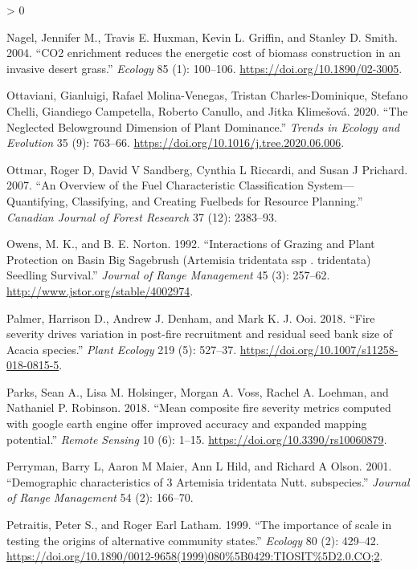 \documentclass[
  12pt,
]{article}
\newlength{\cslhangindent}
\newenvironment{CSLReferences}[2] %
 {%
  \setlength{\parindent}{0pt}
  \ifodd #1 \everypar{\setlength{\hangindent}{\cslhangindent}}\ignorespaces\fi
  \ifnum #2 > 0
  \setlength{\parskip}{#2\baselineskip}
  \fi
 }%
 {}
\begin{document}
\begin{CSLReferences}{1}{0}
\leavevmode\hypertarget{ref-Nagel2004}{}%
Nagel, Jennifer M., Travis E. Huxman, Kevin L. Griffin, and Stanley D.
Smith. 2004. {``{CO2 enrichment reduces the energetic cost of biomass
construction in an invasive desert grass}.''} \emph{Ecology} 85 (1):
100--106. \url{https://doi.org/10.1890/02-3005}.

\leavevmode\hypertarget{ref-Ottaviani2020}{}%
Ottaviani, Gianluigi, Rafael Molina-Venegas, Tristan Charles-Dominique,
Stefano Chelli, Giandiego Campetella, Roberto Canullo, and Jitka
Klimešová. 2020. {``{The Neglected Belowground Dimension of Plant
Dominance}.''} \emph{Trends in Ecology and Evolution} 35 (9): 763--66.
\url{https://doi.org/10.1016/j.tree.2020.06.006}.

\leavevmode\hypertarget{ref-Ottmar2007}{}%
Ottmar, Roger D, David V Sandberg, Cynthia L Riccardi, and Susan J
Prichard. 2007. {``An Overview of the Fuel Characteristic Classification
System---Quantifying, Classifying, and Creating Fuelbeds for Resource
Planning.''} \emph{Canadian Journal of Forest Research} 37 (12):
2383--93.

\leavevmode\hypertarget{ref-Owens1992}{}%
Owens, M. K., and B. E. Norton. 1992. {``{Interactions of Grazing and
Plant Protection on Basin Big Sagebrush (Artemisia tridentata ssp .
tridentata) Seedling Survival}.''} \emph{Journal of Range Management} 45
(3): 257--62. \url{http://www.jstor.org/stable/4002974}.

\leavevmode\hypertarget{ref-Palmer2018}{}%
Palmer, Harrison D., Andrew J. Denham, and Mark K. J. Ooi. 2018.
{``{Fire severity drives variation in post-fire recruitment and residual
seed bank size of Acacia species}.''} \emph{Plant Ecology} 219 (5):
527--37. \url{https://doi.org/10.1007/s11258-018-0815-5}.

\leavevmode\hypertarget{ref-Parks2018}{}%
Parks, Sean A., Lisa M. Holsinger, Morgan A. Voss, Rachel A. Loehman,
and Nathaniel P. Robinson. 2018. {``{Mean composite fire severity
metrics computed with google earth engine offer improved accuracy and
expanded mapping potential}.''} \emph{Remote Sensing} 10 (6): 1--15.
\url{https://doi.org/10.3390/rs10060879}.

\leavevmode\hypertarget{ref-Perryman2001}{}%
Perryman, Barry L, Aaron M Maier, Ann L Hild, and Richard A Olson. 2001.
{``{Demographic characteristics of 3 Artemisia tridentata Nutt.
subspecies}.''} \emph{Journal of Range Management} 54 (2): 166--70.

\leavevmode\hypertarget{ref-Petraitis1999}{}%
Petraitis, Peter S., and Roger Earl Latham. 1999. {``{The importance of
scale in testing the origins of alternative community states}.''}
\emph{Ecology} 80 (2): 429--42.
\url{https://doi.org/10.1890/0012-9658(1999)080\%5B0429:TIOSIT\%5D2.0.CO;2}.


\end{CSLReferences}
\end{document}
